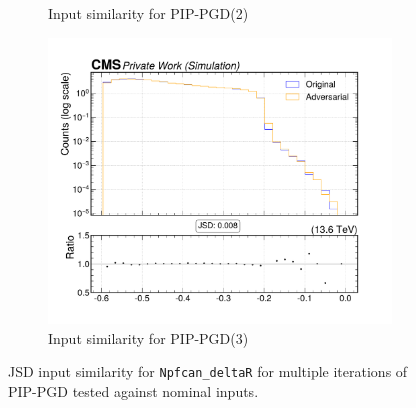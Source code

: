 \begin{figure}[htbp]
\begin{subfigure}[t]{0.32\textwidth}
    \caption*{Input similarity for PIP-PGD(2)}
  \end{subfigure}\hfill
  \begin{subfigure}[t]{0.32\textwidth}
    \includegraphics[width=\linewidth]{media/output/features/compare/combined_it_3/cmp_npf_arr_Npfcan_deltaR.pdf}
    \caption*{Input similarity for PIP-PGD(3)}
  \end{subfigure}

  \caption*{JSD input similarity for \texttt{Npfcan\_deltaR} for multiple iterations of PIP-PGD tested against nominal inputs.}
  \label{fig:combined_input_Npfcan_deltaR}
\end{figure}

